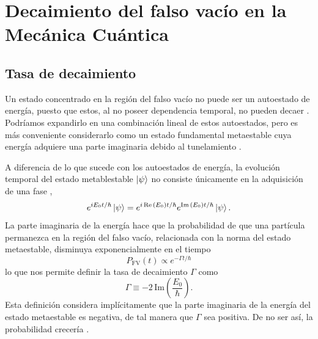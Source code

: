 \chapter{Decaimiento del falso vacío en la Mecánica Cuántica} 



\section{Tasa de decaimiento}

Un estado concentrado en la región del falso vacío no puede ser un autoestado de energía, puesto que estos, al no poseer dependencia temporal, no pueden decaer \cite{andreassen2017precision}. Podríamos expandirlo en una combinación lineal de estos autoestados, pero es más conveniente considerarlo como un estado fundamental metaestable cuya energía adquiere una parte imaginaria debido al tunelamiento  \cite{weinberg2012classical, paranjape2017theory, rubakov2009classical}. 

A diferencia de lo que sucede con los autoestados de energía, la evolución temporal del estado metablestable $\ket{\psi}$ no consiste únicamente en la adquisición de una fase \cite{kleinert2009path},
\begin{equation}
e^{iE_0 t/\hbar}\ket{\psi} = e^{i\Re\qty(E_0) t/\hbar}e^{\Im\qty(E_0) t/\hbar}\ket{\psi}.
\end{equation}
La parte imaginaria de la energía hace que la probabilidad de que una partícula permanezca en la región del falso vacío, relacionada con la norma del estado metaestable, disminuya exponencialmente en el tiempo 
\begin{equation} \label{eq:prob}
P_{\text{FV}}(t) \propto e^{-\Gamma t/\hbar}
\end{equation}
lo que nos permite definir la tasa de decaimiento $\Gamma$ como
\begin{equation}\label{eq:gammaE}
\Gamma \equiv -2 \, \mathrm{Im}\left(\frac{E_0}{\hbar}\right).
\end{equation} 
Esta definición considera implícitamente que la parte imaginaria de la energía del estado metaestable es negativa, de tal manera que $\Gamma$ sea positiva. De no ser así, la probabilidad crecería \cite{kleinert2009path}.%

